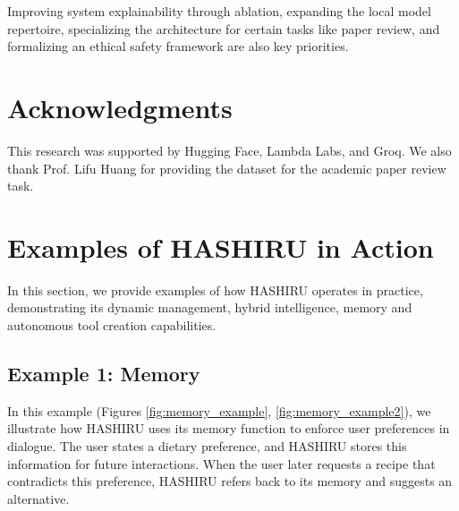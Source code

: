 \documentclass[conference]{IEEEtran}
\begin{document}
Improving system explainability through ablation, expanding the local model repertoire, specializing the architecture for certain tasks like paper review, and formalizing an ethical safety framework are also key priorities.

\section*{Acknowledgments}

This research was supported by Hugging Face, Lambda Labs, and Groq. We also thank Prof. Lifu Huang for providing the dataset for the academic paper review task.




\appendix
\section{Examples of HASHIRU in Action}
\label{sec:examples}
In this section, we provide examples of how HASHIRU operates in practice, demonstrating its dynamic management, hybrid intelligence, memory and autonomous tool creation capabilities.

\subsection{Example 1: Memory}
In this example (Figures \ref{fig:memory_example}, \ref{fig:memory_example2}), we illustrate how HASHIRU uses its memory function to enforce user preferences in dialogue. The user states a dietary preference, and HASHIRU stores this information for future interactions. When the user later requests a recipe that contradicts this preference, HASHIRU refers back to its memory and suggests an alternative.
\end{document}
